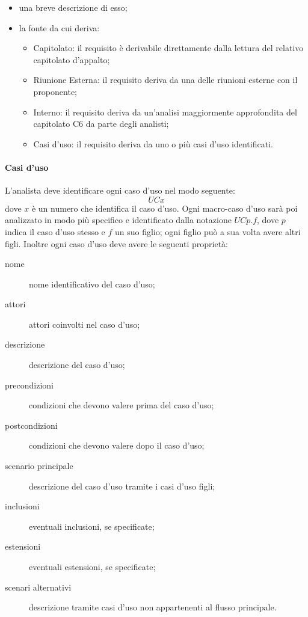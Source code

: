 		\begin{itemize}
			\item una breve descrizione di esso;
			\item la fonte da cui deriva:
			\begin{itemize}
				\item Capitolato: il requisito è derivabile direttamente dalla lettura del relativo capitolato d'appalto;
				\item Riunione Esterna: il requisito deriva da una delle riunioni esterne con il proponente;
				\item Interno: il requisito deriva da un'analisi maggiormente approfondita del capitolato C6 da parte degli analisti;
				\item Casi d'uso: il requisito deriva da uno o più casi d'uso identificati.
			\end{itemize}
		\end{itemize}
		\paragraph{Casi d'uso}
		L'analista deve identificare ogni caso d'uso nel modo seguente:
			\[UCx\]
		dove $x$ è un numero che identifica il caso d'uso. Ogni macro-caso d'uso sarà poi analizzato in modo più specifico e identificato dalla notazione $UCp.f$, dove $p$ indica il caso d'uso stesso e $f$ un suo figlio; ogni figlio può a sua volta avere altri figli. Inoltre ogni caso d'uso deve avere le seguenti proprietà:
		\begin{description}
			\item[nome] nome identificativo del caso d'uso;
			\item[attori] attori coinvolti nel caso d'uso;
			\item[descrizione] descrizione del caso d'uso;
			\item[precondizioni] condizioni che devono valere prima del caso d'uso;%
			\item[postcondizioni] condizioni che devono valere dopo il caso d'uso;%
			\item[scenario principale] descrizione del caso d'uso tramite i casi d'uso figli;
			\item[inclusioni] eventuali inclusioni, se specificate;
			\item[estensioni] eventuali estensioni, se specificate;
			\item[scenari alternativi] descrizione tramite casi d'uso non appartenenti al flusso principale.
		\end{description}
